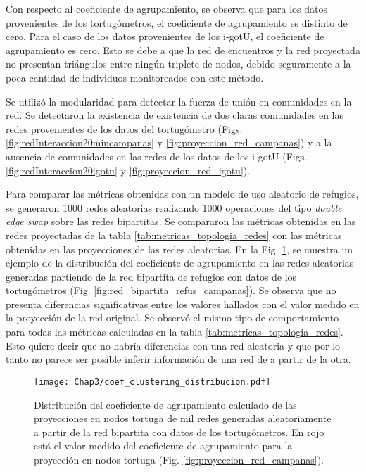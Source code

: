 Con respecto al coeficiente de agrupamiento, se observa que para los datos provenientes de los tortugómetros, el coeficiente de agrupamiento es distinto de cero. Para el caso de los datos provenientes de los i-gotU, el coeficiente de agrupamiento es cero. Esto se debe a que la red de encuentros y la red proyectada no presentan triángulos entre ningún triplete de nodos, debido seguramente a la poca cantidad de individuos monitoreados con este método. 

Se utilizó la modularidad para detectar la fuerza de unión en comunidades en la red. Se detectaron la existencia de existencia de dos claras comunidades en las redes provenientes de los datos del tortugómetro (Figs. \ref{fig:redInteraccion20mincampanas} y \ref{fig:proyeccion_red_campanas}) y a la ausencia de comunidades en las redes de los datos de los i-gotU (Figs. \ref{fig:redInteraccion20igotu} y \ref{fig:proyeccion_red_igotu}).
 
Para comparar las métricas obtenidas con un modelo de uso aleatorio de refugios, se generaron 1000 redes aleatorias  realizando 1000 operaciones del tipo \textit{double edge swap} sobre las redes bipartitas. Se compararon las métricas obtenidas en las redes proyectadas de la tabla \ref{tab:metricas_topologia_redes} con las métricas obtenidas en las proyecciones de las redes aleatorias. En la Fig. \ref{fig:distribucion_coef_agrupa}, se muestra un ejemplo de la distribución del coeficiente de agrupamiento en las redes aleatorias generadas partiendo de la red bipartita de refugios con datos de los tortugómetros (Fig. \ref{fig:red_bipartita_refus_campanas}). Se observa que no presenta diferencias significativas entre los valores hallados con el valor medido en la proyección de la red original. Se observó el mismo tipo de comportamiento para todas las métricas calculadas en la tabla \ref{tab:metricas_topologia_redes}. Esto quiere decir que no habría diferencias con una red aleatoria y que por lo tanto no parece ser posible inferir información de una red de a partir de la otra.
\begin{figure}[ht]
    \begin{center}
        \texttt{[image: Chap3/coef\_clustering\_distribucion.pdf]}
        \caption[Distribución del coeficiente de agrupamiento en proyecciones de redes aleatorias.]{Distribución del coeficiente de agrupamiento calculado de las proyecciones en nodos tortuga de mil redes generadas aleatoriamente a partir de la red bipartita con datos de los tortugómetros. En rojo está el valor medido del coeficiente de agrupamiento para la proyección en nodos tortuga (Fig. \ref{fig:proyeccion_red_campanas}).}
        \label{fig:distribucion_coef_agrupa}
       
        \end{center}
\end{figure}
 
